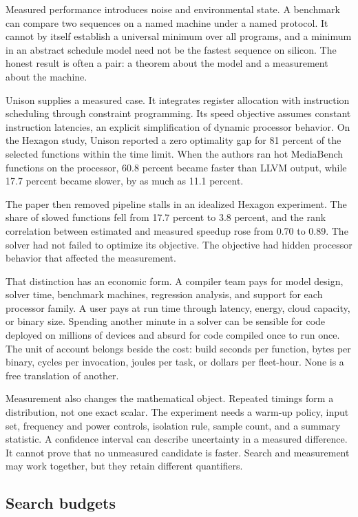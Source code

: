 Measured performance introduces noise and environmental state. A benchmark
can compare two sequences on a named machine under a named protocol. It
cannot by itself establish a universal minimum over all programs, and a
minimum in an abstract schedule model need not be the fastest sequence on
silicon. The honest result is often a pair: a theorem about the model and a
measurement about the machine.

Unison supplies a measured case. It integrates register allocation with
instruction scheduling through constraint programming. Its speed objective
assumes constant instruction latencies, an explicit simplification of dynamic
processor behavior. On the Hexagon study, Unison reported a zero optimality
gap for 81 percent of the selected functions within the time limit. When the
authors ran hot MediaBench functions on the processor, 60.8 percent became
faster than LLVM output, while 17.7 percent became slower, by as much as 11.1
percent.\autocite{castanedalozano2019unison}

The paper then removed pipeline stalls in an idealized Hexagon experiment.
The share of slowed functions fell from 17.7 percent to 3.8 percent, and the
rank correlation between estimated and measured speedup rose from 0.70 to
0.89. The solver had not failed to optimize its objective. The objective had
hidden processor behavior that affected the measurement.

That distinction has an economic form. A compiler team pays for model design,
solver time, benchmark machines, regression analysis, and support for each
processor family. A user pays at run time through latency, energy, cloud
capacity, or binary size. Spending another minute in a solver can be sensible
for code deployed on millions of devices and absurd for code compiled once to
run once. The unit of account belongs beside the cost: build seconds per
function, bytes per binary, cycles per invocation, joules per task, or dollars
per fleet-hour. None is a free translation of another.

Measurement also changes the mathematical object. Repeated timings form a
distribution, not one exact scalar. The experiment needs a warm-up policy,
input set, frequency and power controls, isolation rule, sample count, and a
summary statistic. A confidence interval can describe uncertainty in a
measured difference. It cannot prove that no unmeasured candidate is faster.
Search and measurement may work together, but they retain different
quantifiers.

\subsection{Search budgets}

